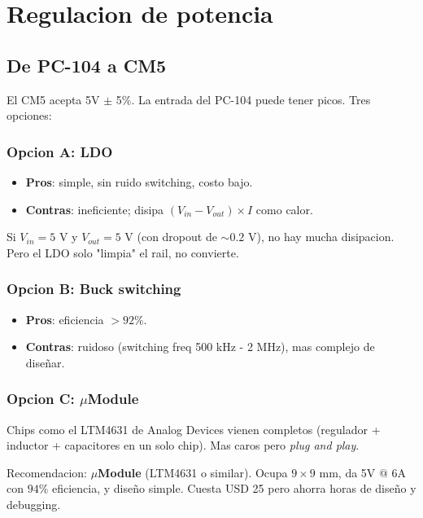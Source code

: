 \documentclass[11pt,a4paper,oneside,openright]{book}
\begin{document}
\chapter{Regulacion de potencia}

\section{De PC-104 a CM5}

El CM5 acepta 5V $\pm$ 5\%. La entrada del PC-104 puede tener picos.
Tres opciones:

\subsection{Opcion A: LDO}

\begin{itemize}[leftmargin=2em]
  \item \textbf{Pros}: simple, sin ruido switching, costo bajo.
  \item \textbf{Contras}: ineficiente; disipa $(V_{in} - V_{out}) \times I$ como calor.
\end{itemize}

Si $V_{in} = 5$ V y $V_{out} = 5$ V (con dropout de $\sim 0.2$ V), no hay
mucha disipacion. Pero el LDO solo "limpia" el rail, no convierte.

\subsection{Opcion B: Buck switching}

\begin{itemize}[leftmargin=2em]
  \item \textbf{Pros}: eficiencia $> 92\%$.
  \item \textbf{Contras}: ruidoso (switching freq 500 kHz - 2 MHz), mas
        complejo de diseñar.
\end{itemize}

\subsection{Opcion C: $\mu$Module}

Chips como el LTM4631 de Analog Devices vienen completos (regulador +
inductor + capacitores en un solo chip). Mas caros pero \emph{plug and play}.

\begin{payload}
Recomendacion: \textbf{$\mu$Module} (LTM4631 o similar). Ocupa $9\times 9$ mm,
da 5V $@$ 6A con $94\%$ eficiencia, y diseño simple. Cuesta USD 25 pero
ahorra horas de diseño y debugging.
\end{payload}
\end{document}
